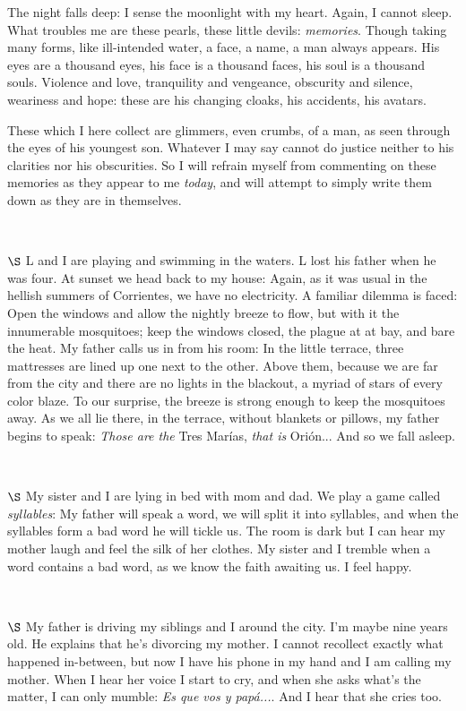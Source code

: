 \documentclass[a4paper, 12pt]{article}
\begin{document}
The night falls deep: I sense the moonlight with my heart. Again, I cannot
sleep. What troubles me are these pearls, these little devils:
\textit{memories}. Though taking many forms, like ill-intended water, a face, a
name, a man always appears. His eyes are a thousand eyes, his face is a
thousand faces, his soul is a thousand souls. Violence and love, tranquility
and vengeance, obscurity and silence, weariness and hope: these are his
changing cloaks, his accidents, his avatars. 

These which I here collect are glimmers, even crumbs, of a man, as seen through
the eyes of his youngest son. Whatever I may say cannot do justice neither to his 
clarities nor his obscurities. So I will refrain myself from commenting on these memories 
as they appear to me \textit{today}, and will attempt to simply write them down as they 
are in themselves.

~ 

$\S$ L and I are playing and swimming in the waters. L lost his father when he
was four. At sunset we head back to my house: Again, as it was usual in the
hellish summers of Corrientes, we have no electricity. A familiar dilemma is
faced: Open the windows and allow the nightly breeze to flow, but with it the
innumerable mosquitoes; keep the windows closed, the plague at at bay,
and bare the heat. My father calls us in from his room: In the little terrace,
three mattresses are lined up one next to the other. Above them, because we are 
far from the city and there are no lights in the blackout, a myriad of stars of every
color blaze. To our surprise, the breeze is strong enough to keep the mosquitoes 
away. As we all lie there, in the terrace, without blankets or pillows,
my father begins to speak: \textit{Those are the} Tres Marías, \textit{that is } Orión...
And so we fall asleep.

~ 


$\S$ My sister and I are lying in bed with mom and dad. We play a game called
\textit{syllables}: My father will speak a word, we will split it into
syllables, and when the syllables form a bad word he will tickle us. The room
is dark but I can hear my mother laugh and feel the silk of her clothes. My 
sister and I tremble when a word contains a bad word, as we know the faith awaiting us. 
I feel happy.

~ 

$\S$ My father is driving my siblings and I around the city. I'm maybe nine
years old. He explains that he's divorcing my mother. I cannot recollect
exactly what happened in-between, but now I have his phone in my hand and I am
calling my mother. When I hear her voice I start to cry, and when she asks
what's the matter, I can only mumble: \textit{Es que vos y papá...}. And I hear
that she cries too.
\end{document}
